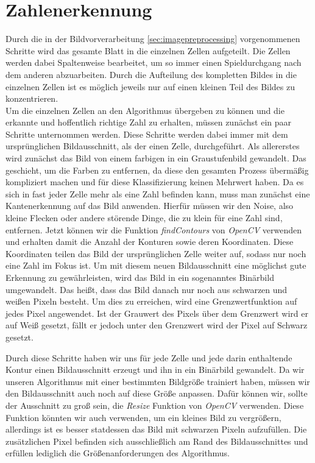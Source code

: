 \section{Zahlenerkennung} \label{sec:digit_rec}
Durch die in der Bildvorverarbeitung \ref{sec:imagepreprocessing} vorgenommenen Schritte wird das gesamte Blatt in die einzelnen Zellen aufgeteilt. Die Zellen werden dabei Spaltenweise bearbeitet, um so immer einen Spieldurchgang nach dem anderen abzuarbeiten. Durch die Aufteilung des kompletten Bildes in die einzelnen Zellen ist es möglich jeweils nur auf einen kleinen Teil des Bildes zu konzentrieren.\\\hfill
Um die einzelnen Zellen an den Algorithmus übergeben zu können und die erkannte und hoffentlich richtige Zahl zu erhalten, müssen zunächst ein paar Schritte unternommen werden. Diese Schritte werden dabei immer mit dem ursprünglichen Bildausschnitt, als der einen Zelle, durchgeführt. Als allererstes wird zunächst das Bild von einem farbigen in ein Graustufenbild gewandelt. Das geschieht, um die Farben zu entfernen, da diese den gesamten Prozess übermäßig kompliziert machen und für diese Klassifizierung keinen Mehrwert haben. Da es sich in fast jeder Zelle mehr als eine Zahl befinden kann, muss man zunächst eine Kantenerkennung auf das Bild anwenden. Hierfür müssen wir den Noise, also kleine Flecken oder andere störende Dinge, die zu klein für eine Zahl sind, entfernen. Jetzt können wir die Funktion \textit{findContours} von \textit{OpenCV} verwenden und erhalten damit die Anzahl der Konturen sowie deren Koordinaten. Diese Koordinaten teilen das Bild der ursprünglichen Zelle weiter auf, sodass nur noch eine Zahl im Fokus ist. Um mit diesem neuen Bildausschnitt eine möglichst gute Erkennung zu gewährleisten, wird das Bild in ein sogenanntes Binärbild umgewandelt. Das heißt, dass das Bild danach nur noch aus schwarzen und weißen Pixeln besteht. Um dies zu erreichen, wird eine Grenzwertfunktion auf jedes Pixel angewendet. Ist der Grauwert des Pixels über dem Grenzwert wird er auf Weiß gesetzt, fällt er jedoch unter den Grenzwert wird der Pixel auf Schwarz gesetzt.\par
Durch diese Schritte haben wir uns für jede Zelle und jede darin enthaltende Kontur einen Bildausschnitt erzeugt und ihn in ein Binärbild gewandelt. Da wir unseren Algorithmus mit einer bestimmten Bildgröße trainiert haben, müssen wir den Bildausschnitt auch noch auf diese Größe anpassen. Dafür können wir, sollte der Ausschnitt zu groß sein, die \textit{Resize} Funktion von \textit{OpenCV} verwenden. Diese Funktion könnten wir auch verwenden, um ein kleines Bild zu vergrößern, allerdings ist es besser statdessen das Bild mit schwarzen Pixeln aufzufüllen. Die zusätzlichen Pixel befinden sich ausschließlich am Rand des Bildausschnittes und erfüllen lediglich die Größenanforderungen des Algorithmus.\par
